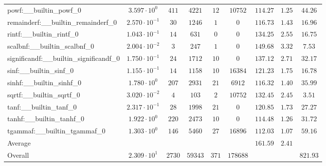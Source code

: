 \begin{tabular}{|l|c|c|c|c|c|c|c|c|}
powf:\_\_builtin\_powf\_0                 & $ 3.597 \cdot 10^{0}  $ & $ 411    $ & $ 4221  $ & $ 12  $ & $ 10752  $ & $ 114.27      $ & $ 1.25    $ & $ 44.26   $ \\
remainderf:\_\_builtin\_remainderf\_0     & $ 2.570 \cdot 10^{-1} $ & $ 30     $ & $ 1246  $ & $ 1   $ & $ 0      $ & $ 116.73      $ & $ 1.43    $ & $ 16.96   $ \\
rintf:\_\_builtin\_rintf\_0               & $ 1.043 \cdot 10^{-1} $ & $ 14     $ & $ 631   $ & $ 0   $ & $ 0      $ & $ 134.25      $ & $ 2.55    $ & $ 16.75   $ \\
scalbnf:\_\_builtin\_scalbnf\_0           & $ 2.004 \cdot 10^{-2} $ & $ 3      $ & $ 247   $ & $ 1   $ & $ 0      $ & $ 149.68      $ & $ 3.32    $ & $ 7.53    $ \\
significandf:\_\_builtin\_significandf\_0 & $ 1.750 \cdot 10^{-1} $ & $ 24     $ & $ 1712  $ & $ 10  $ & $ 0      $ & $ 137.12      $ & $ 2.71    $ & $ 32.17   $ \\
sinf:\_\_builtin\_sinf\_0                 & $ 1.155 \cdot 10^{-1} $ & $ 14     $ & $ 1158  $ & $ 10  $ & $ 16384  $ & $ 121.23      $ & $ 1.75    $ & $ 16.78   $ \\
sinhf:\_\_builtin\_sinhf\_0               & $ 1.780 \cdot 10^{0}  $ & $ 207    $ & $ 2931  $ & $ 21  $ & $ 6912   $ & $ 116.32      $ & $ 1.40    $ & $ 35.99   $ \\
sqrtf:\_\_builtin\_sqrtf\_0               & $ 3.020 \cdot 10^{-2} $ & $ 4      $ & $ 103   $ & $ 2   $ & $ 10752  $ & $ 132.45      $ & $ 2.45    $ & $ 3.51    $ \\
tanf:\_\_builtin\_tanf\_0                 & $ 2.317 \cdot 10^{-1} $ & $ 28     $ & $ 1998  $ & $ 21  $ & $ 0      $ & $ 120.85      $ & $ 1.73    $ & $ 27.27   $ \\
tanhf:\_\_builtin\_tanhf\_0               & $ 1.922 \cdot 10^{0}  $ & $ 220    $ & $ 2473  $ & $ 10  $ & $ 0      $ & $ 114.48      $ & $ 1.26    $ & $ 31.72   $ \\
tgammaf:\_\_builtin\_tgammaf\_0           & $ 1.303 \cdot 10^{0}  $ & $ 146    $ & $ 5460  $ & $ 27  $ & $ 16896  $ & $ 112.03      $ & $ 1.07    $ & $ 59.16   $ \\
\hline
Average                                   & $                     $ & $        $ & $       $ & $     $ & $        $ & $ 161.59      $ & $ 2.41    $ & $         $ \\
\hline
Overall                                   & $ 2.309 \cdot 10^{1}  $ & $ 2730   $ & $ 59343 $ & $ 371 $ & $ 178688 $ & $             $ & $         $ & $ 821.93  $ \\
\hline
\end{tabular}
